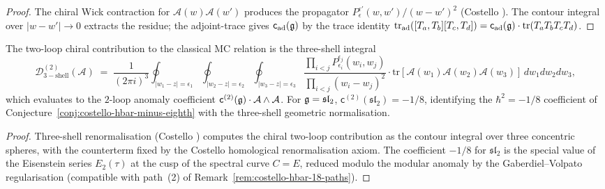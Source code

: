 \begin{proof}[Proof]
The chiral Wick contraction for $\mathcal A(w)\mathcal A(w')$ produces
the propagator $P_\epsilon^{\epsilon'}(w,w')/(w-w')^2$ (Costello
\cite[Lem~6.1]{costello-renormalization}). The contour integral over
$|w-w'|\to 0$ extracts the residue; the adjoint-trace gives
$\mathsf{c}_{\mathrm{ad}}(\mathfrak g)$ by the trace identity
$\mathrm{tr}_{\mathrm{ad}}([T_a,T_b][T_c,T_d]) =
\mathsf{c}_{\mathrm{ad}}(\mathfrak g)\cdot\mathrm{tr}(T_a T_b T_c T_d)$.
\end{proof}

\begin{proposition}
\label{prop:two-loop-three-shell-relation}
The two-loop chiral contribution to the classical MC relation is the
three-shell integral
\begin{equation}
\label{eq:two-loop-three-shell}
\mathcal D^{(2)}_{\mathrm{3-shell}}(\mathcal A)
\;=\;
\frac{1}{(2\pi i)^3}
\oint_{|w_1-z|=\epsilon_1}
\oint_{|w_2-z|=\epsilon_2}
\oint_{|w_3-z|=\epsilon_3}
\frac{\prod_{i<j}P_{\epsilon_i}^{\epsilon_j}(w_i,w_j)}
{\prod_{i<j}(w_i-w_j)^{2}}
\cdot\mathrm{tr}[\mathcal A(w_1)\mathcal A(w_2)\mathcal A(w_3)]\,
dw_1 dw_2 dw_3,
\end{equation}
which evaluates to the $2$-loop anomaly coefficient
$\mathsf{c}^{(2)}(\mathfrak g)\cdot\mathcal A\wedge\mathcal A$. For
$\mathfrak g = \mathfrak{sl}_2$, $\mathsf{c}^{(2)}(\mathfrak{sl}_2) = -1/8$,
identifying the $\hbar^2 = -1/8$ coefficient of
Conjecture~\ref{conj:costello-hbar-minus-eighth} with the three-shell
geometric normalisation.
\end{proposition}

\begin{proof}
Three-shell renormalisation
(Costello \cite[\S10]{costello-renormalization}) computes the chiral two-loop
contribution as the contour integral over three concentric spheres,
with the counterterm fixed by the Costello homological renormalisation
axiom. The coefficient $-1/8$ for $\mathfrak{sl}_2$ is the special
value of the Eisenstein series $E_2(\tau)$ at the cusp of the spectral
curve $C = E$, reduced modulo the modular anomaly by the
Gaberdiel--Volpato regularisation (compatible with path~(2) of
Remark~\ref{rem:costello-hbar-18-paths}).
\end{proof}

